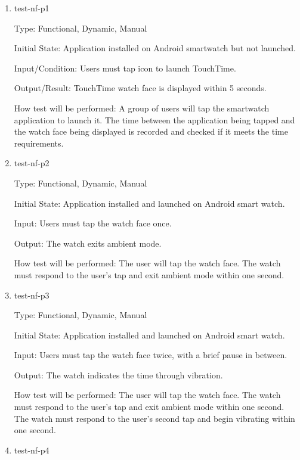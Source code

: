 \begin{enumerate}

\item{test-nf-p1\\}

Type: Functional, Dynamic, Manual
					
Initial State: Application installed on Android smartwatch but not launched.
					
Input/Condition: Users must tap icon to launch TouchTime.
					
Output/Result: TouchTime watch face is displayed within 5 seconds. 
					
How test will be performed: A group of users will tap the smartwatch application to launch it. The time between the application being tapped and the watch face being displayed is recorded and checked if it meets the time requirements.
					
\item{test-nf-p2\\}

Type: Functional, Dynamic, Manual
					
Initial State: Application installed and launched on Android smart watch. 
					
Input: Users must tap the watch face once.
					
Output: The watch exits ambient mode.
					
How test will be performed: The user will tap the watch face. The watch must respond to the user's tap and exit ambient mode within one second.

\item{test-nf-p3\\}

Type: Functional, Dynamic, Manual
					
Initial State: Application installed and launched on Android smart watch. 
					
Input: Users must tap the watch face twice, with a brief pause in between.
					
Output: The watch indicates the time through vibration.
					
How test will be performed:  The user will tap the watch face. The watch must respond to the user's tap and exit ambient mode within one second. The watch must respond to the user's second tap and begin vibrating within one second.

\item{test-nf-p4\\}


\end{enumerate}
